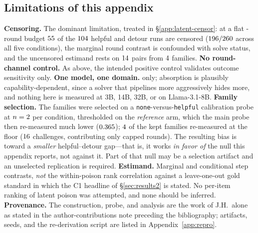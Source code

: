 \subsection{Limitations of this appendix}
\textbf{Censoring.} The dominant limitation, treated in
\S\ref{app:latent-censor}: at a flat \GtwoMaxRounds{}-round budget
$55{}$ of the $104{}$ helpful and detour runs are censored
($196{}/260{}$ across all five conditions), the marginal round
contrast is confounded with solve status, and the uncensored estimand rests on
$14{}$ pairs from $4{}$ families. \textbf{No round-channel control.} As above, the
intended positive control validates outcome sensitivity only. \textbf{One model, one
domain.} \GtwoModel{} only; absorption is plausibly capability-dependent, since a solver
that pipelines more aggressively hides more, and nothing here is measured at 3B, 14B, 32B,
or on Llama-3.1-8B. \textbf{Family selection.} The \GtwoSelNIn{} families were selected on
a \texttt{none}-versus-\texttt{helpful} calibration probe at $n=2$ per condition,
thresholded on the \emph{reference} arm, which the main probe then re-measured much lower
($0.365{}$); $4{}$ of the \GtwoNFam{} kept families re-measured
at the floor ($16{}$ challenges, contributing only capped rounds). The
resulting bias is toward a \emph{smaller} helpful--detour gap---that is, it works
\emph{in favor of} the null this appendix reports, not against it. Part of that null may
be a selection artifact and an unselected replication is required. \textbf{Estimand.}
Marginal and conditional step contrasts, \emph{not} the within-poison rank correlation
against a leave-one-out gold standard in which the C1 headline of \S\ref{sec:results2} is
stated. No per-item ranking of latent poison was attempted, and none should be inferred.
\textbf{Provenance.} The construction, probe, and analysis are the work of J.H.\ alone
as stated in the author-contributions note preceding the bibliography; artifacts, seeds, and the re-derivation script are listed in
Appendix~\ref{app:repro}.
